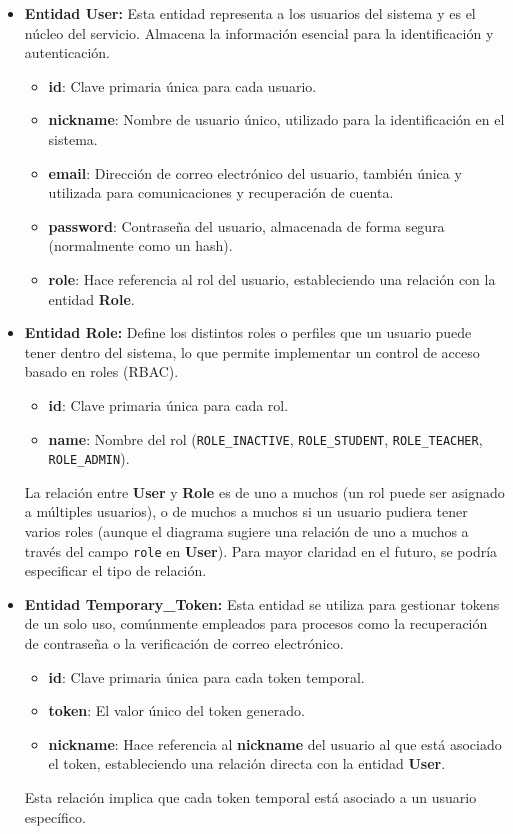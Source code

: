 \begin{itemize}
    \item \textbf{Entidad User:}
    Esta entidad representa a los usuarios del sistema y es el núcleo del servicio. Almacena la información esencial para la identificación y autenticación.
    \begin{itemize}
        \item \textbf{id}: Clave primaria única para cada usuario.
        \item \textbf{nickname}: Nombre de usuario único, utilizado para la identificación en el sistema.
        \item \textbf{email}: Dirección de correo electrónico del usuario, también única y utilizada para comunicaciones y recuperación de cuenta.
        \item \textbf{password}: Contraseña del usuario, almacenada de forma segura (normalmente como un hash).
        \item \textbf{role}: Hace referencia al rol del usuario, estableciendo una relación con la entidad \textbf{Role}.
    \end{itemize}

    \item \textbf{Entidad Role:}
    Define los distintos roles o perfiles que un usuario puede tener dentro del sistema, lo que permite implementar un control de acceso basado en roles (RBAC).
    \begin{itemize}
        \item \textbf{id}: Clave primaria única para cada rol.
        \item \textbf{name}: Nombre del rol (\texttt{ROLE\_INACTIVE}, \texttt{ROLE\_STUDENT}, \texttt{ROLE\_TEACHER}, \texttt{ROLE\_ADMIN}).
    \end{itemize}
    La relación entre \textbf{User} y \textbf{Role} es de uno a muchos (un rol puede ser asignado a múltiples usuarios), o de muchos a muchos si un usuario pudiera tener varios roles (aunque el diagrama sugiere una relación de uno a muchos a través del campo \texttt{role} en \textbf{User}). Para mayor claridad en el futuro, se podría especificar el tipo de relación.

    \item \textbf{Entidad Temporary\_Token:}
    Esta entidad se utiliza para gestionar tokens de un solo uso, comúnmente empleados para procesos como la recuperación de contraseña o la verificación de correo electrónico.
    \begin{itemize}
        \item \textbf{id}: Clave primaria única para cada token temporal.
        \item \textbf{token}: El valor único del token generado.
        \item \textbf{nickname}: Hace referencia al \textbf{nickname} del usuario al que está asociado el token, estableciendo una relación directa con la entidad \textbf{User}.
    \end{itemize}
    Esta relación implica que cada token temporal está asociado a un usuario específico.
\end{itemize}

